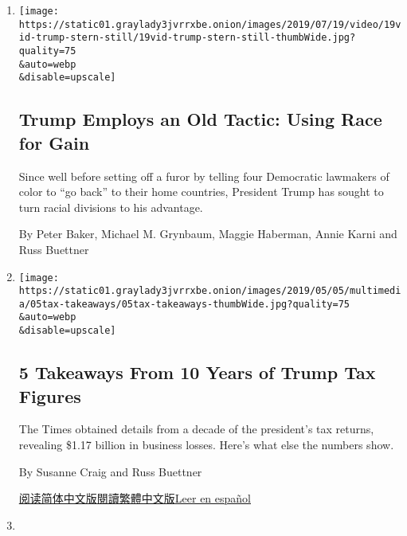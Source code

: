 \begin{enumerate}
\def\labelenumi{\arabic{enumi}.}
\item
  \href{/2019/07/20/us/politics/trump-race-record.html}{}

  \texttt{[image: https://static01.graylady3jvrrxbe.onion/images/2019/07/19/video/19vid-trump-stern-still/19vid-trump-stern-still-thumbWide.jpg?quality=75\\\&auto=webp\\\&disable=upscale]}

  \hypertarget{trump-employs-an-old-tactic-using-race-for-gain}{%
  \subsection{Trump Employs an Old Tactic: Using Race for
  Gain}\label{trump-employs-an-old-tactic-using-race-for-gain}}

  Since well before setting off a furor by telling four Democratic
  lawmakers of color to ``go back'' to their home countries, President
  Trump has sought to turn racial divisions to his advantage.

  By Peter Baker, Michael M. Grynbaum, Maggie Haberman, Annie Karni and
  Russ Buettner
\item
  \href{/2019/05/07/us/trump-tax-figures.html}{}

  \texttt{[image: https://static01.graylady3jvrrxbe.onion/images/2019/05/05/multimedia/05tax-takeaways/05tax-takeaways-thumbWide.jpg?quality=75\\\&auto=webp\\\&disable=upscale]}

  \hypertarget{5-takeaways-from-10-years-of-trump-tax-figures}{%
  \subsection{5 Takeaways From 10 Years of Trump Tax
  Figures}\label{5-takeaways-from-10-years-of-trump-tax-figures}}

  The Times obtained details from a decade of the president's tax
  returns, revealing \$1.17 billion in business losses. Here's what else
  the numbers show.

  By Susanne Craig and Russ Buettner

  \href{https://cn.nytimes3xbfgragh.onion/usa/20190508/trump-tax-figures/}{阅读简体中文版}\href{https://cn.nytimes3xbfgragh.onion/usa/20190508/trump-tax-figures/zh-hant/}{閱讀繁體中文版}\href{https://www.nytimes3xbfgragh.onion/es/2019/05/08/trump-declaraciones-impuestos/}{Leer
  en español}
\item
  \href{/interactive/2019/05/07/us/politics/donald-trump-taxes.html}{}


\end{enumerate}
